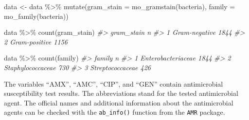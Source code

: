 \documentclass[
]{book}
\newenvironment{Shaded}{\begin{snugshade}}{\end{snugshade}}
\newcommand{\AttributeTok}[1]{\textcolor[rgb]{0.77,0.63,0.00}{#1}}
\newcommand{\CommentTok}[1]{\textcolor[rgb]{0.56,0.35,0.01}{\textit{#1}}}
\newcommand{\FunctionTok}[1]{\textcolor[rgb]{0.00,0.00,0.00}{#1}}
\newcommand{\NormalTok}[1]{#1}
\newcommand{\OtherTok}[1]{\textcolor[rgb]{0.56,0.35,0.01}{#1}}
\newcommand{\SpecialCharTok}[1]{\textcolor[rgb]{0.00,0.00,0.00}{#1}}
\begin{document}
\begin{Shaded}
\begin{Highlighting}[]
\NormalTok{data }\OtherTok{\textless{}{-}}\NormalTok{ data }\SpecialCharTok{\%\textgreater{}\%}
  \FunctionTok{mutate}\NormalTok{(}\AttributeTok{gram\_stain =} \FunctionTok{mo\_gramstain}\NormalTok{(bacteria),}
         \AttributeTok{family =} \FunctionTok{mo\_family}\NormalTok{(bacteria))}

\NormalTok{data }\SpecialCharTok{\%\textgreater{}\%}
  \FunctionTok{count}\NormalTok{(gram\_stain)}
\CommentTok{\#\textgreater{}      gram\_stain    n}
\CommentTok{\#\textgreater{} 1 Gram{-}negative 1844}
\CommentTok{\#\textgreater{} 2 Gram{-}positive 1156}

\NormalTok{data }\SpecialCharTok{\%\textgreater{}\%}
  \FunctionTok{count}\NormalTok{(family)}
\CommentTok{\#\textgreater{}               family    n}
\CommentTok{\#\textgreater{} 1 Enterobacteriaceae 1844}
\CommentTok{\#\textgreater{} 2 Staphylococcaceae   730}
\CommentTok{\#\textgreater{} 3 Streptococcaceae    426}
\end{Highlighting}
\end{Shaded}

The variables ``AMX'', ``AMC'', ``CIP'', and ``GEN'' contain antimicrobial susceptibility test results. The abbreviations stand for the tested antimicrobial agent. The official names and additional information about the antimicrobial agents can be checked with the \texttt{ab\_info()} function from the \texttt{AMR} package.
\end{document}
